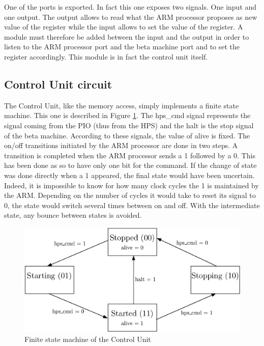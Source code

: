 One of the ports is exported. In fact this one exposes two signals. One input and one output. The 
output allows to read what the ARM processor proposes as new value of the register while the input 
allows to set the value of the register. A module must therefore be added between the input and the 
output in order to listen to the ARM processor port and the beta machine port and to set the 
register accordingly. This module is in fact the control unit itself.

\subsection{Control Unit circuit}

The Control Unit, like the memory access, simply implements a finite state machine. This one is 
described in Figure \ref{fig:ctrlu/fsm}. The hps\_cmd signal represents the signal coming from the 
PIO (thus from the HPS) and the halt is the stop signal of the beta machine. According to these 
signals, the value of alive is fixed. The on/off transitions initiated by the ARM processor are 
done in two steps. A transition is completed when the ARM processor sends a 1 followed by a 0. This 
has been done as so to have only one bit for the command. If the change of state was done directly 
when a 1 appeared, the final state would have been uncertain. Indeed, it is impossible to know for 
how many clock cycles the 1 is maintained by the ARM. Depending on the number of cycles it would 
take to reset its signal to 0, the state would switch several times between on and off. With 
the intermediate state, any bounce between states is avoided.

\begin{figure}[ht!]
    \center
    \includegraphics[scale=0.8]{"Chapter5-MAU_CTRLU/res/ctrlu_fsm"}
    \caption{Finite state machine of the Control Unit}
    \label{fig:ctrlu/fsm}
\end{figure}

